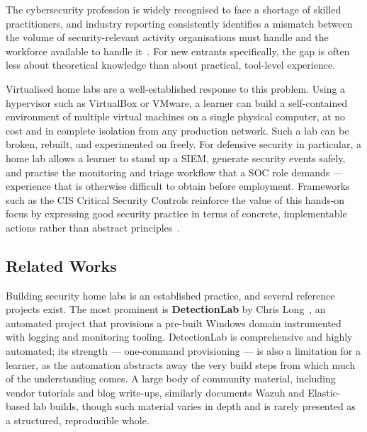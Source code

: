 The cybersecurity profession is widely recognised to face a shortage of
skilled practitioners, and industry reporting consistently identifies a
mismatch between the volume of security-relevant activity organisations must
handle and the workforce available to handle it~\cite{verizondbir}. For new
entrants specifically, the gap is often less about theoretical knowledge than
about practical, tool-level experience.

Virtualised home labs are a well-established response to this problem. Using a
hypervisor such as VirtualBox or VMware, a learner can build a self-contained
environment of multiple virtual machines on a single physical computer, at no
cost and in complete isolation from any production network. Such a lab can be
broken, rebuilt, and experimented on freely. For defensive security in
particular, a home lab allows a learner to stand up a SIEM, generate security
events safely, and practise the monitoring and triage workflow that a SOC role
demands --- experience that is otherwise difficult to obtain before
employment. Frameworks such as the CIS Critical Security Controls reinforce
the value of this hands-on focus by expressing good security practice in terms
of concrete, implementable actions rather than abstract principles~\cite{ciscontrols}.

\subsection{Related Works}

Building security home labs is an established practice, and several reference
projects exist. The most prominent is \textbf{DetectionLab} by Chris
Long~\cite{detectionlab}, an automated project that provisions a pre-built
Windows domain instrumented with logging and monitoring tooling. DetectionLab
is comprehensive and highly automated; its strength --- one-command
provisioning --- is also a limitation for a learner, as the automation
abstracts away the very build steps from which much of the understanding
comes. A large body of community material, including vendor tutorials and
blog write-ups, similarly documents Wazuh and Elastic-based lab builds, though
such material varies in depth and is rarely presented as a structured,
reproducible whole.

